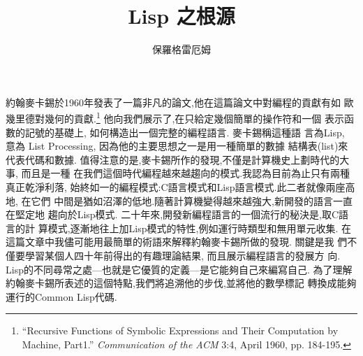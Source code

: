 \documentclass[12pt,a4]{article}
\begin{document}
 
\begin{CJK}{UTF8}{bsmi} %
\title{Lisp 之根源} 
\author{保羅格雷厄姆} 
\maketitle 
\newcommand{\pone}{$p_{1}$} 
\newcommand{\pn}{$p_{n}$} 
\newcommand{\aone}{$a_{1}$} 
\newcommand{\an}{$a_{n}$} 
\newcommand{\vone}{$v_{1}$} 
\newcommand{\vn}{$v_{n}$} 
\newcommand{\eone}{$e_{1}$} 
\newcommand{\en}{$e_{n}$} 
約翰麥卡錫於1960年發表了一篇非凡的論文,他在這篇論文中對編程的貢獻有如 
歐幾里德對幾何的貢獻.\footnote{``Recursive Functions of Symbolic Expressions and Their Computation by Machine, Part1.'' 
{\it Communication of the ACM} 3:4, April 1960, pp.  184-195.} 
他向我們展示了,在只給定幾個簡單的操作符和一個 
表示函數的記號的基礎上, 
如何構造出一個完整的編程語言. 
麥卡錫稱這種語 
言為Lisp, 
意為 
List 
Processing, 
因為他的主要思想之一是用一種簡單的數據 
結構表(list)來代表代碼和數據. 
值得注意的是,麥卡錫所作的發現,不僅是計算機史上劃時代的大事, 
而且是一種 
在我們這個時代編程越來越趨向的模式.我認為目前為止只有兩種真正乾淨利落, 
始終如一的編程模式:C語言模式和Lisp語言模式.此二者就像兩座高地, 
在它們 
中間是猶如沼澤的低地.隨著計算機變得越來越強大,新開發的語言一直在堅定地 
趨向於Lisp模式. 
二十年來,開發新編程語言的一個流行的秘決是,取C語言的計 
算模式,逐漸地往上加Lisp模式的特性,例如運行時類型和無用單元收集. 
在這篇文章中我儘可能用最簡單的術語來解釋約翰麥卡錫所做的發現. 
關鍵是我 
們不僅要學習某個人四十年前得出的有趣理論結果, 
而且展示編程語言的發展方 
向. 
Lisp的不同尋常之處---也就是它優質的定義---是它能夠自己來編寫自己. 
為了理解約翰麥卡錫所表述的這個特點,我們將追溯他的步伐,並將他的數學標記 
轉換成能夠運行的Common 
Lisp代碼. 

\end{CJK}
\end{document}

